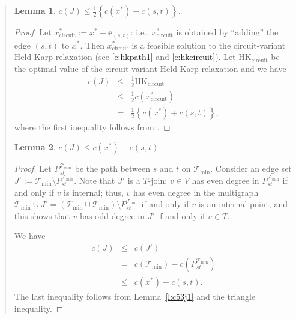 \documentclass[11pt,letterpaper]{article}
\newtheorem{lemma}{Lemma}
\begin{document}
\begin{quote}
\begin{lemma}
\label{l:c53j2}
$c(J)\leq \frac{1}{2}\left\{c(x^*)+c(s,t)\right\}$.
\end{lemma}
\begin{proof}
Let $x^*_{\mathrm{circuit}} := x^*+\mathbf{e}_{(s,t)}$: i.e., $x^*_{\mathrm{circuit}}$ is obtained by ``adding'' the edge $(s,t)$ to $x^*$. Then $x^*_{\mathrm{circuit}}$ is a feasible solution to the circuit-variant Held-Karp relaxation (see \eqref{e:hkpath1} and \eqref{e:hkcircuit}). Let $\mathrm{HK_{circuit}}$ be the optimal value of the circuit-variant Held-Karp relaxation and we have\begin{eqnarray*}
c(J)&\leq& \frac{1}{2}\mathrm{HK_{circuit}}\\
& \leq& \frac{1}{2} c(x^*_{\mathrm{circuit}})\\
& =& \frac{1}{2} \left\{ c(x^*)+c(s,t) \right\}
,\end{eqnarray*}where the first inequality follows from \cite{W, SW}.
\end{proof}

\begin{lemma}
\label{l:c53j3}
$c(J)\leq c(x^*)-c(s,t)$.
\end{lemma}
\begin{proof}
Let $P_{st}^{\mathscr{T}_{\mathrm{min}}}$ be the path between $s$ and $t$ on $\mathscr{T}_{\mathrm{min}}$. Consider an edge set $J':=\mathscr{T}_{\mathrm{min}}\setminus P_{st}^{\mathscr{T}_{\mathrm{min}}}$. Note that $J'$ is a $T$-join: $v\in V$ has even degree in $P_{st}^{\mathscr{T}_{\mathrm{min}}}$ if and only if $v$ is internal; thus, $v$ has even degree in the multigraph $\mathscr{T}_{\mathrm{min}}\cup J'=(\mathscr{T}_{\mathrm{min}}\cup \mathscr{T}_{\mathrm{min}})\setminus P_{st}^{\mathscr{T}_{\mathrm{min}}}$ if and only if $v$ is an internal point, and this shows that $v$ has odd degree in $J'$ if and only if $v\in T$.

We have\begin{eqnarray*}
c(J) &\leq& c(J')\\
&=& c(\mathscr{T}_{\mathrm{min}})-c(P_{st}^{\mathscr{T}_{\mathrm{min}}})\\
&\leq& c(x^*) -c(s,t)
.\end{eqnarray*}The last inequality follows from Lemma~\ref{l:c53j1} and the triangle inequality.
\end{proof}


\end{quote}
\end{document}
